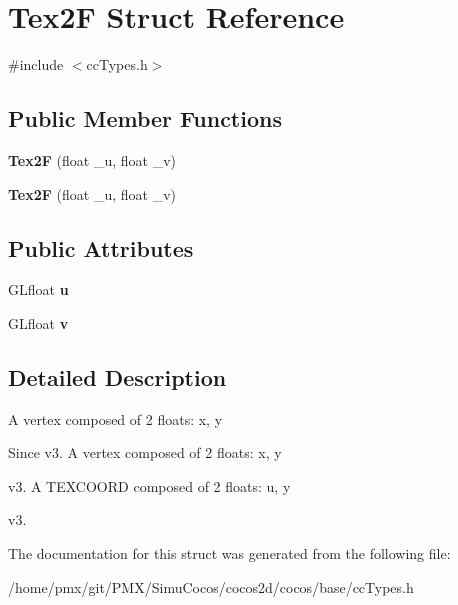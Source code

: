 \hypertarget{structTex2F}{}\section{Tex2F Struct Reference}
\label{structTex2F}


{\ttfamily \#include $<$cc\+Types.\+h$>$}

\subsection*{Public Member Functions}
\begin{DoxyCompactItemize}
\item 
\mbox{\label{structTex2F_aa6debb6d2a8f2640b3c8c8929b682e75}} 
{\bfseries Tex2F} (float \+\_\+u, float \+\_\+v)
\item 
\mbox{\label{structTex2F_aa6debb6d2a8f2640b3c8c8929b682e75}} 
{\bfseries Tex2F} (float \+\_\+u, float \+\_\+v)
\end{DoxyCompactItemize}
\subsection*{Public Attributes}
\begin{DoxyCompactItemize}
\item 
\mbox{\label{structTex2F_a38a163eddc9a5ed6e466d741202a2be4}} 
G\+Lfloat {\bfseries u}
\item 
\mbox{\label{structTex2F_a93e1dc4620fe1376de3089b29da8e519}} 
G\+Lfloat {\bfseries v}
\end{DoxyCompactItemize}


\subsection{Detailed Description}
A vertex composed of 2 floats\+: x, y \begin{DoxySince}{Since}
v3. A vertex composed of 2 floats\+: x, y 

v3. A T\+E\+X\+C\+O\+O\+RD composed of 2 floats\+: u, y 

v3. 
\end{DoxySince}


The documentation for this struct was generated from the following file\+:\begin{DoxyCompactItemize}
\item 
/home/pmx/git/\+P\+M\+X/\+Simu\+Cocos/cocos2d/cocos/base/cc\+Types.\+h\end{DoxyCompactItemize}
